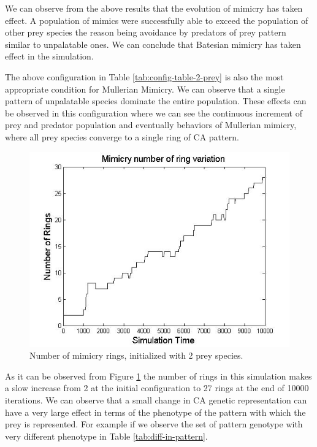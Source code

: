 We can observe from the above results that the evolution of mimicry has taken effect. A population of mimics were successfully able to exceed the population of other prey species the reason being avoidance by predators of prey pattern similar to unpalatable ones. We can conclude that Batesian mimicry has taken effect in the simulation.

The above configuration in Table \ref{tab:config-table-2-prey} is also the most appropriate condition for Mullerian Mimicry. We can observe that a single pattern of unpalatable species dominate the entire population. These effects can be observed in this configuration where we can see the continuous increment of prey and predator population and eventually behaviors of Mullerian mimicry, where all prey species converge to a single ring of CA pattern.

\begin{figure}[H]
	\centering
	\includegraphics[scale=0.50]{images/ringSize10k-2Prey}
	\caption[Number of mimicry rings (2 prey species)]{Number of mimicry rings, initialized with 2 prey species.}
	\label{fig:ringSize10k-2Prey}
\end{figure}

As it can be observed from Figure \ref{fig:ringSize10k-2Prey} the number of rings in this simulation makes a slow increase from 2 at the initial configuration to 27 rings at the end of 10000 iterations. We can observe that a small change in CA genetic representation can have a very large effect in terms of the phenotype of the pattern with which the prey is represented. For example if we observe the set of pattern genotype with very different phenotype in Table \ref{tab:diff-in-pattern}.

